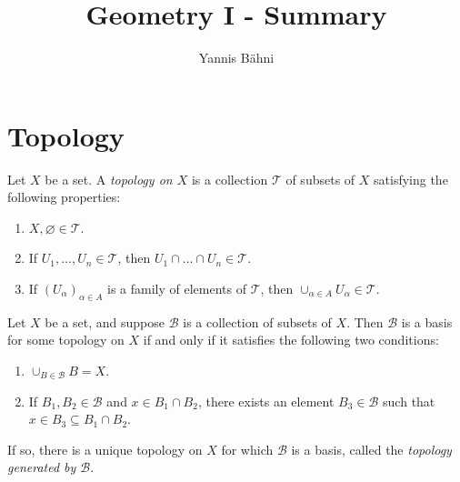 


\title{Geometry I - Summary}
\author{Yannis B\"{a}hni}
\address[Yannis B\"{a}hni]{University of Zurich, R\"{a}mistrasse 71, 8006 Zurich}

\maketitle
\thispagestyle{fancy}


\originalsectionstyle

\section{Topology}
\begin{definition}
	Let $X$ be a set. A \emph{topology on $X$} is a collection $\mathcal{T}$ of subsets of $X$ satisfying the following properties:
	
	\begin{enumerate}[label = (\roman*)]
		\item $X,\varnothing \in \mathcal{T}$.
		\item If $U_1,\dots,U_n \in \mathcal{T}$, then $U_1 \cap \dots \cap U_n \in \mathcal{T}$.
		\item If $(U_\alpha)_{\alpha \in A}$ is a family of elements of $\mathcal{T}$, then $\cup_{\alpha \in A} U_\alpha \in \mathcal{T}$.
	\end{enumerate}
\end{definition}

\vspace{1mm}

\begin{definition}
	Let $X$ be a set, and suppose $\mathcal{B}$ is a collection of subsets of $X$. Then $\mathcal{B}$ is a basis for some topology on $X$ if and only if it satisfies the following two conditions:
	\begin{enumerate}[label = (\roman*)]
		\item $\cup_{B \in \mathcal{B}} B = X$.
		\item If $B_1, B_2 \in \mathcal{B}$ and $x \in B_1 \cap B_2$, there exists an element $B_3 \in \mathcal{B}$ such that $x \in B_3 \subseteq B_1 \cap B_2$. 
	\end{enumerate}

	If so, there is a unique topology on $X$ for which $\mathcal{B}$ is a basis, called the \emph{topology generated by $\mathcal{B}$}.
\end{definition}

